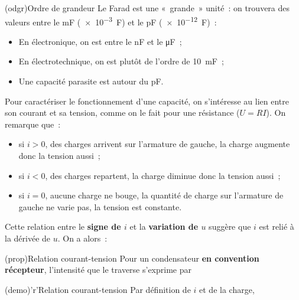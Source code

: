 \documentclass[../../main/main.tex]{subfiles}
\begin{document}
\begin{tcb}(odgr){Ordre de grandeur}
	Le Farad est une «~grande~» unité~: on trouvera des valeurs entre le \si{mF}
	(\SI{e-3}{F}) et le \si{pF} (\SI{e-12}{F})~:
	\begin{itemize}
		\item En électronique, on est entre le \si{nF} et le \si{\micro F}~;
		\item En électrotechnique, on est plutôt de l'ordre de \SI{10}{mF}~;
		\item Une capacité parasite est autour du \si{pF}.
	\end{itemize}
\end{tcb}

Pour caractériser le fonctionnement d'une capacité, on s'intéresse au lien entre
son courant et sa tension, comme on le fait pour une résistance ($U = RI$). On
remarque que~:
\begin{itemize}
	\item si $i > 0$, des charges arrivent sur l'armature de gauche, la charge
	      augmente donc la tension aussi~;
	\item si $i < 0$, des charges repartent, la charge diminue donc la tension
	      aussi~;
	\item si $i = 0$, aucune charge ne bouge, la quantité de charge sur
	      l'armature de gauche ne varie pas, la tension est constante.
\end{itemize}

Cette relation entre le \textbf{signe de $i$} et la \textbf{variation de $u$}
suggère que $i$ est relié à la dérivée de $u$. On a alors~:

\begin{tcbraster}[raster columns=2, raster equal height=rows]
	\begin{tcb}[label=prop:Ccarac](prop){Relation courant-tension}
		Pour un condensateur \textbf{en convention récepteur}, l'intensité que
		le traverse s'exprime par
		\psw{
			\[\boxed{i = C \dv{u_C}{t}}\]
		}
		\vspace{-15pt}
	\end{tcb}
	\begin{tcb}[label=demo:Ccarac](demo)'r'{Relation courant-tension}
		Par définition de $i$ et de la charge,
		\vspace{-15pt}
	\end{tcb}
\end{tcbraster}
\end{document}
